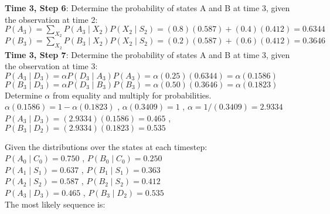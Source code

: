 \documentclass[fleqn]{hw8}
\begin{document}
\begin{enumerate}
\textbf{Time 3, Step 6}: Determine the probability of states A and B at time 3, given the observation at time 2: \\
$\displaystyle P(A_3) = \sum_{X_2} P(A_3 \mid X_2)P(X_2 \mid S_2) = (0.8)(0.587) + (0.4)(0.412) = 0.6344 $ \\
$\displaystyle P(B_3) = \sum_{X_2} P(B_3 \mid X_2)P(X_2 \mid S_2) = (0.2)(0.587) + (0.6)(0.412) = 0.3646 $ \\

\textbf{Time 3, Step 7}: Determine the probability of states A and B at time 3, given the observation at time 3: \\
$\displaystyle P(A_3 \mid D_3) = \alpha P(D_3 \mid A_3)P(A_3) = \alpha (0.25)(0.6344) = \alpha (0.1586) $ \\
$\displaystyle P(B_3 \mid D_3) = \alpha P(D_3 \mid B_3)P(B_3) = \alpha (0.50)(0.3646) = \alpha (0.1823) $ \\
Determine $\alpha$ from equality and multiply for probabilities.\\
$\alpha (0.1586) = 1 - \alpha (0.1823) $ , $\alpha (0.3409) = 1 $ , $\alpha = 1/(0.3409) = 2.9334 $ \\
$P(A_3 \mid D_3) = (2.9334)(0.1586) = \mathbf{0.465} $ , $P(B_3 \mid D_2) = (2.9334)(0.1823) = \mathbf{0.535}$\\
\begin{framed}
	Given the distributions over the states at each timestep:\\
	$P(A_0 \mid C_0) = \mathbf{0.750} $ , $P(B_0 \mid C_0) = 0.250$\\
	$P(A_1 \mid S_1) = \mathbf{0.637} $ , $P(B_1 \mid S_1) = 0.363$\\
	$P(A_2 \mid S_2) = \mathbf{0.587} $ , $P(B_2 \mid S_2) = 0.412$\\
	$P(A_3 \mid D_3) = 0.465 $ , $P(B_3 \mid D_2) = \mathbf{0.535}$\\
	The most likely sequence is: 
\end{framed}

\end{enumerate}
\end{document}
